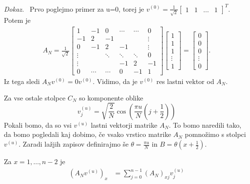 \documentclass[a4paper,12pt,openright]{book}
\newenvironment{dokaz}{\emph{Dokaz.}\ }{\hspace{\fill}{$\Box$}}
\begin{document}
\begin{dokaz}
Prvo poglejmo primer za u=0, torej je $v^{(0)}= \frac{1}{\sqrt{2}}\begin{bmatrix} 1 & 1 & \dots & 1\end{bmatrix}^T$. Potem je
\begin{gather*}
  A_N =  \frac{1}{\sqrt{2}}
  \begin{bmatrix}
    1      & -1     & 0      & \cdots & \cdots & 0      \\
    -1     & 2      & -1     &        &        & \vdots \\
    0      & -1     & 2      & -1     &        & \vdots \\
    \vdots &        & \ddots & \ddots & \ddots & 0      \\
    \vdots &        &        &  -1    & 2      & -1     \\
    0      & \cdots & \cdots &  0     & -1     & 1       
  \end{bmatrix}
  \begin{bmatrix}
    1 \\
    1 \\
    1 \\
    \vdots \\
    1  
  \end{bmatrix}
  =
  \begin{bmatrix}
    0 \\
    0 \\
    0 \\
    \vdots \\
    0  
  \end{bmatrix}.
\end{gather*}
Iz tega sledi $A_N v^{(0)} = 0 v^{(0)}$. Vidimo, da je $v^{(0)}$ res lastni vektor od $A_N$.\par
Za vse ostale stolpce $C_N$ so komponente oblike
\begin{equation*}
    v_j^{(u)} = \sqrt{\frac{2}{N}}\cos\left( \frac{\pi u}{N}(j+\frac{1}{2}) \right)
\end{equation*}
Pokali bomo, da so vsi $v^{(u)}$ lastni vektorji matrike $A_N$. To bomo naredili tako, da bomo pogledali kaj dobimo, če vsako vrstico matrike $A_N$ pomnožimo s stolpci $v^{(u)}$. Zaradi lažjih zapisov definirajmo še $\theta = \frac{\pi u}{N}$ in $B = \theta(x+\frac{1}{2})$.\par
Za $x=1,\ldots,n-2$ je
\begin{equation*}
    \begin{aligned}
        (A_N v^{(u)})_x &= \sum_{j=0}^{n-1} (A_N)_{xj} v_j^{(u)} \\

\end{aligned}
\end{equation*}
\end{dokaz}
\end{document}

